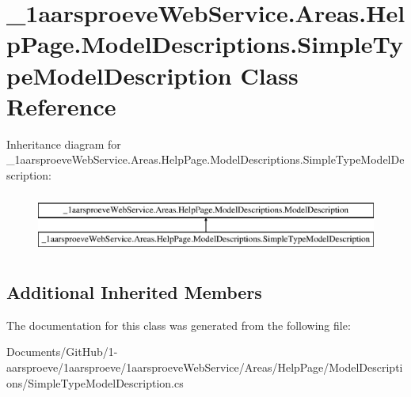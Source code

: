 \hypertarget{class__1aarsproeve_web_service_1_1_areas_1_1_help_page_1_1_model_descriptions_1_1_simple_type_model_description}{}\section{\+\_\+1aarsproeve\+Web\+Service.\+Areas.\+Help\+Page.\+Model\+Descriptions.\+Simple\+Type\+Model\+Description Class Reference}
\label{class__1aarsproeve_web_service_1_1_areas_1_1_help_page_1_1_model_descriptions_1_1_simple_type_model_description}
Inheritance diagram for \+\_\+1aarsproeve\+Web\+Service.\+Areas.\+Help\+Page.\+Model\+Descriptions.\+Simple\+Type\+Model\+Description\+:\begin{figure}[H]
\begin{center}
\leavevmode
\includegraphics[height=2.000000cm]{class__1aarsproeve_web_service_1_1_areas_1_1_help_page_1_1_model_descriptions_1_1_simple_type_model_description}
\end{center}
\end{figure}
\subsection*{Additional Inherited Members}


The documentation for this class was generated from the following file\+:\begin{DoxyCompactItemize}
\item 
Documents/\+Git\+Hub/1-\/aarsproeve/1aarsproeve/1aarsproeve\+Web\+Service/\+Areas/\+Help\+Page/\+Model\+Descriptions/Simple\+Type\+Model\+Description.\+cs\end{DoxyCompactItemize}
